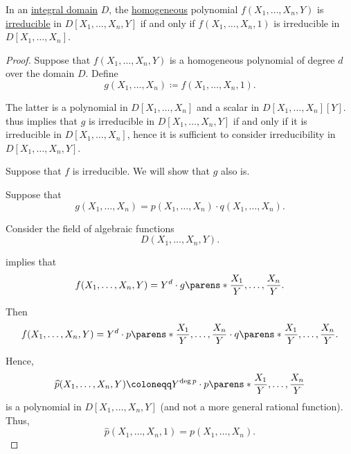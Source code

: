 \begin{proposition}\label{thm:homogeneous_polynomial_constant}
  In an \hyperref[def:integral_domain]{integral domain} \( D \), the \hyperref[def:homogeneous_polynomial]{homogeneous} polynomial \( f(X_1, \ldots, X_n, Y) \) is \hyperref[def:domain_divisibility/irreducible]{irreducible} in \( D[X_1, \ldots, X_n, Y] \) if and only if \( f(X_1, \ldots, X_n, 1) \) is irreducible in \( D[X_1, \ldots, X_n] \).
\end{proposition}
\begin{proof}
  Suppose that \( f(X_1, \ldots, X_n, Y) \) is a homogeneous polynomial of degree \( d \) over the domain \( D \). Define
  \begin{equation*}
    g(X_1, \ldots, X_n) \coloneqq f(X_1, \ldots, X_n, 1).
  \end{equation*}

  The latter is a polynomial in \( D[X_1, \ldots, X_n] \) and a scalar in \( D[X_1, \ldots, X_n][Y] \).  thus implies that \( g \) is irreducible in \( D[X_1, \ldots, X_n, Y] \) if and only if it is irreducible in \( D[X_1, \ldots, X_n] \), hence it is sufficient to consider irreducibility in \( D[X_1, \ldots, X_n, Y] \).

  \SufficiencySubProof Suppose that \( f \) is irreducible. We will show that \( g \) also is.

  Suppose that
  \begin{equation*}
    g(X_1, \ldots, X_n) = p(X_1, \ldots, X_n) \cdot q(X_1, \ldots, X_n).
  \end{equation*}

  Consider the field of algebraic functions
  \begin{equation*}
    D(X_1, \ldots, X_n, Y).
  \end{equation*}

   implies that
  \begin{equation*}
    f(X_1, \ldots, X_n, Y) = Y^d \cdot g\parens*{ \frac {X_1} Y, \ldots, \frac {X_n} Y }.
  \end{equation*}

  Then
  \begin{equation*}
    f(X_1, \ldots, X_n, Y) = Y^d \cdot p\parens*{ \frac {X_1} Y, \ldots, \frac {X_n} Y } \cdot q\parens*{ \frac {X_1} Y, \ldots, \frac {X_n} Y }.
  \end{equation*}

  Hence,
  \begin{equation*}
    \widehat{p}(X_1, \ldots, X_n, Y) \coloneqq Y^{\deg p} \cdot p\parens*{ \frac {X_1} Y, \ldots, \frac {X_n} Y }
  \end{equation*}
  is a polynomial in \( D[X_1, \ldots, X_n, Y] \) (and not a more general rational function). Thus,
  \begin{equation*}
    \widehat{p}(X_1, \ldots, X_n, 1) = p(X_1, \ldots, X_n).
  \end{equation*}


\end{proof}

